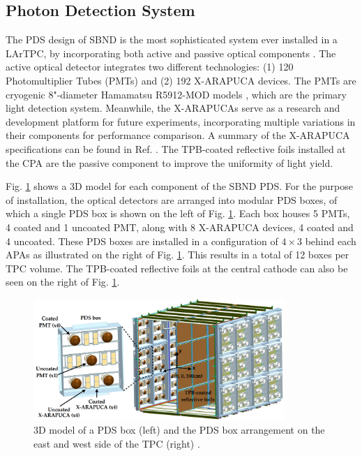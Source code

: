 \subsection{Photon Detection System}
\label{sec:sbnd_pds}

The PDS design of SBND is the most sophisticated system ever installed in a LArTPC, by incorporating both active and passive optical components \cite{sbnd_pds_paper}. 
The active optical detector integrates two different technologies: (1) 120 Photomultiplier Tubes (PMTs) and (2) 192 X-ARAPUCA devices.
The PMTs are cryogenic 8"-diameter Hamamatsu R5912-MOD models \cite{hamamatsu}, which are the primary light detection system. 
Meanwhile, the X-ARAPUCAs serve as a research and development platform for future experiments, incorporating multiple variations in their components for performance comparison. 
A summary of the X-ARAPUCA specifications can be found in Ref. \cite{sbnd_pds_paper}.
The TPB-coated reflective foils installed at the CPA are the passive component to improve the uniformity of light yield.

Fig. \ref{fig:SBND_PDS} shows a 3D model for each component of the SBND PDS.
For the purpose of installation, the optical detectors are arranged into modular PDS boxes, of which a single PDS box is shown on the left of Fig. \ref{fig:SBND_PDS}.
Each box houses 5 PMTs, 4 coated and 1 uncoated PMT, along with 8 X-ARAPUCA devices, 4 coated and 4 uncoated.
These PDS boxes are installed in a configuration of $4 \times 3$ behind each APAs as illustrated on the right of Fig. \ref{fig:SBND_PDS}.
This results in a total of 12 boxes per TPC volume.
The TPB-coated reflective foils at the central cathode can also be seen on the right of Fig. \ref{fig:SBND_PDS}.

\begin{figure}[hbp]
\centering    
\includegraphics[width=0.85\textwidth]{SBND_PDS}
\caption[Photon Detection System 3D Model]{
3D model of a PDS box (left) and the PDS box arrangement on the east and west side of the TPC (right) \cite{sbnd_pds_paper}.
}
\label{fig:SBND_PDS}
\end{figure}

